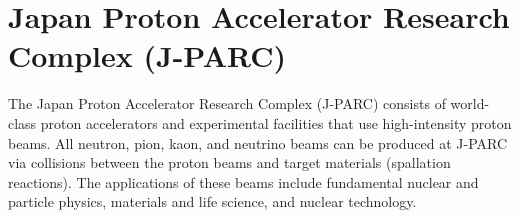 \begin{comment}
In the $\SM$ production, SAC in front of the KURAMA magnet vetoed outgoing $\pP$s with a rejection efficiency $\sim99\%$ under the data-taking rate of 300 kHz \cite{Koba-2016}. Therefore, 1\% of $\pP$ data SAC accepted were accumulated simultaneously. The byproduct data include the $\PiKL$ reaction when $\pP$ from the $\kzdecay$ decay passed through the KURAMA magnet. This paper analyzed the $\PiKL$ reaction data to search for Lp scattering events and measure beam L polarization as a feasibility study of the next-generation $\Lp$ scattering experiment, J-PARC E86. Our analysis assumed that the $\PiKL$ reaction produced the beam $\Lambda$ for the $\Lp$ scattering. 

The analysis method assuming the detector configuration of the present experiment to identify the $\PiKL$ reaction has been established for the first time. We developed a new $\Kz$ identification method where the KURAMA spectrometer and the CATCH system detect $\pP$ and $\pM$ from the $\kzdecay$ decay, respectively. This is due to the limited spectrometer acceptance of the KURAMA spectrometer. To compensate for the missing information of $\pM$ energy, we introduced \say{$\Kz$ assumption} for the detected $\pP$ and $\pM$. This method assumes that the two $\pi$s originate from the $\kzdecay$ decay and determines the momentum of $\pM$ so that the invariant mass between $\pP$ and $\pM$ is equal to the mass of $\Kz$. Then, the missing mass of the $\PiKX$ reaction was calculated. If the $\Lambda$ production events occur, the missing mass peak corresponding to the mass of $\Lambda$ appears: the $\Kz$ assumption is valid for such events. Conversely, spurious events, \say{non-$\Kz$ events}, in which $\Kz$ was not produced formed huge background structures in the missing mass spectrum. From this $\PiKL$ reaction analysis explained above \textcolor{red}{$\sim379$ k $\Lambda$ in a momentum range of $0.25-1.25$ GeV/$c$ were identified.} Using these momentum-tagged beam $\Lambda$s, the $\Lp$ scattering event search and beam $\Lambda$ polarization measurement were performed. 

\end{comment}


\section{Japan Proton Accelerator Research Complex (J-PARC)}
\label{sec-jparc}

The Japan Proton Accelerator Research Complex (J-PARC) consists of world-class proton accelerators and experimental facilities that use high-intensity proton beams. All neutron, pion, kaon, and neutrino beams can be produced at J-PARC via collisions between the proton beams and target materials (spallation reactions). The applications of these beams include fundamental nuclear and particle physics, materials and life science, and nuclear technology.

